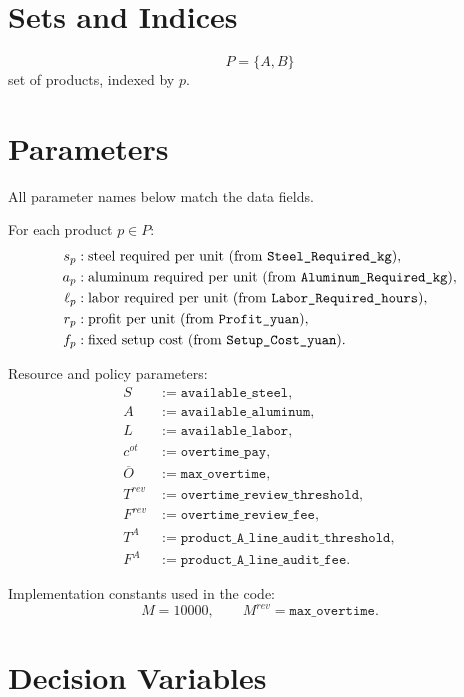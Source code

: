 \section*{Sets and Indices}

\[
P=\{A,B\}
\]
set of products, indexed by \(p\).

\section*{Parameters}

All parameter names below match the data fields.

For each product \(p \in P\):
\begin{align*}
s_p &: \text{steel required per unit (from \texttt{Steel\_Required\_kg})},\\
a_p &: \text{aluminum required per unit (from \texttt{Aluminum\_Required\_kg})},\\
\ell_p &: \text{labor required per unit (from \texttt{Labor\_Required\_hours})},\\
r_p &: \text{profit per unit (from \texttt{Profit\_yuan})},\\
f_p &: \text{fixed setup cost (from \texttt{Setup\_Cost\_yuan})}.
\end{align*}

Resource and policy parameters:
\begin{align*}
S &:= \texttt{available\_steel},\\
A &:= \texttt{available\_aluminum},\\
L &:= \texttt{available\_labor},\\
c^{ot} &:= \texttt{overtime\_pay},\\
\overline{O} &:= \texttt{max\_overtime},\\
T^{rev} &:= \texttt{overtime\_review\_threshold},\\
F^{rev} &:= \texttt{overtime\_review\_fee},\\
T^A &:= \texttt{product\_A\_line\_audit\_threshold},\\
F^A &:= \texttt{product\_A\_line\_audit\_fee}.
\end{align*}

Implementation constants used in the code:
\[
M = 10000, \qquad M^{rev} = \texttt{max\_overtime}.
\]

\section*{Decision Variables}

